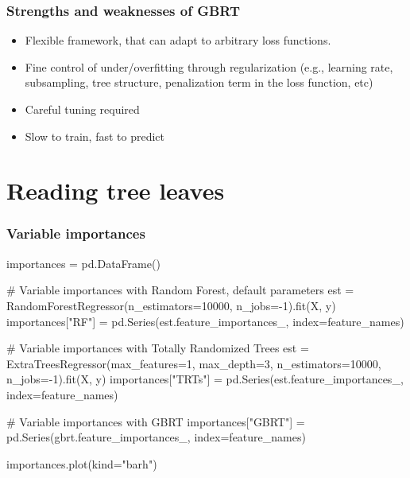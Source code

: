 \documentclass{beamer}
\begin{document}
\begin{frame}
  \frametitle{Strengths and weaknesses of GBRT}

  \begin{itemize}
        \item {\color{blue} Flexible framework}, that can adapt to arbitrary
              loss functions.

        \vspace{0.25cm}

        \item Fine control of under/overfitting through {\color{blue}
              regularization} (e.g., learning rate, subsampling,
              tree structure, penalization term in the loss function, etc)

        \vspace{0.25cm}

        \item {\color{red} Careful tuning} required

        \vspace{0.25cm}

        \item {\color{red} Slow} to train, {\color{blue} fast} to predict
  \end{itemize}
\end{frame}




\section{Reading tree leaves}

\begin{frame}[fragile]
  \frametitle{Variable importances}

{\scriptsize
\begin{pythoncode}
importances = pd.DataFrame()

# Variable importances with Random Forest, default parameters
est = RandomForestRegressor(n_estimators=10000, n_jobs=-1).fit(X, y)
importances["RF"] = pd.Series(est.feature_importances_,
                              index=feature_names)

# Variable importances with Totally Randomized Trees
est = ExtraTreesRegressor(max_features=1, max_depth=3,
                          n_estimators=10000, n_jobs=-1).fit(X, y)
importances["TRTs"] = pd.Series(est.feature_importances_,
                                index=feature_names)

# Variable importances with GBRT
importances["GBRT"] = pd.Series(gbrt.feature_importances_,
                                index=feature_names)

importances.plot(kind="barh")
\end{pythoncode}
}

\end{frame}
\end{document}
